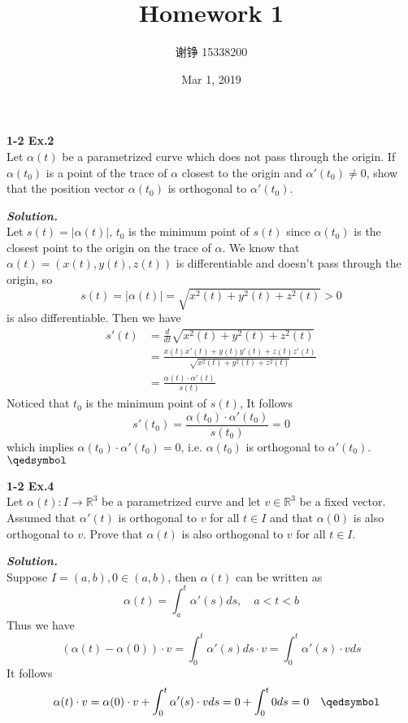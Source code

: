 \documentclass{article}
\author{谢铮 15338200}
\title{Homework 1}
\date{Mar 1, 2019}
\begin{document}
\maketitle

\setlength\parindent{0em}   %
\setlength\parskip{1.0\baselineskip} %

\par
\textbf{1-2 Ex.2}\\
Let $\alpha(t)$ be a parametrized curve which does not pass through the origin. If $\alpha(t_0)$
is a point of the trace of $\alpha$ closest to the origin and $\alpha'(t_0) \neq 0$, show that the 
position vector $\alpha(t_0)$ is orthogonal to $\alpha'(t_0)$.

\par
\textbf{\textit{Solution.}}\\
Let $s(t) = |\alpha(t)|$, $t_0$ is the minimum point of $s(t)$ since $\alpha(t_0)$ is the closest 
point to the origin on the trace of $\alpha$.
We know that $\alpha(t) = (x(t), y(t), z(t))$ is differentiable and doesn't pass through the origin, so
$$
s(t) = |\alpha(t)| = \sqrt{x^2(t) + y^2(t) + z^2(t)} > 0
$$ 
is also differentiable. Then we have
$$
\begin{aligned}
s'(t) &= \frac{d}{dt}\sqrt{x^2(t) + y^2(t) + z^2(t)}\\ 
&=\frac{x(t)x'(t) + y(t)y'(t) + z(t)z'(t)}{\sqrt{x^2(t) + y^2(t) + z^2(t)}}\\
&=\frac{\alpha(t) \cdot \alpha'(t)}{s(t)}
\end{aligned}
$$
Noticed that $t_0$ is the minimum point of $s(t)$, It follows
$$
s'(t_0) = \frac{\alpha(t_0) \cdot \alpha'(t_0)}{s(t_0)} = 0
$$
which implies $\alpha(t_0) \cdot \alpha'(t_0) = 0$, i.e. $\alpha(t_0)$ is orthogonal to $\alpha'(t_0)$. \quad $\qedsymbol$

\par
\textbf{1-2 Ex.4}\\
Let $\alpha(t): I \to \mathbb{R}^3$ be a parametrized curve and let $v \in \mathbb{R}^3$ be a fixed
vector. Assumed that $\alpha'(t)$ is orthogonal to $v$ for all $t \in I$ and that $\alpha(0)$ is also
orthogonal to $v$. Prove that $\alpha(t)$ is also orthogonal to $v$ for all $t \in I$.

\par
\textbf{\textit{Solution.}}\\
Suppose $I = (a, b), 0 \in (a, b)$, then $\alpha(t)$ can be written as
$$
    \alpha(t) = \int_a^t\alpha'(s)ds, \quad a < t < b
$$
Thus we have
$$
    (\alpha(t) - \alpha(0)) \cdot v = \int_0^t\alpha'(s)ds \cdot v = \int_0^t\alpha'(s) \cdot v ds
$$
It follows
$$
    \quad \alpha(t) \cdot v = \alpha(0) \cdot v + \int_0^t\alpha'(s) \cdot v ds = 0 + \int_0^t0ds = 0 \quad \qedsymbol
$$
\end{document}
